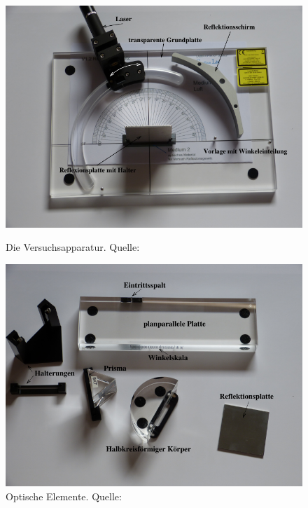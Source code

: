 \begin{figure}[H]
  \begin{minipage}[b]{.55\linewidth} %
     \includegraphics[width=\linewidth]{pictures/Aufbau.png}
     \caption{Die Versuchsapparatur. Quelle: \cite{AP01}}
     \label{fig:Aufbau}
  \end{minipage}
  \begin{minipage}[b]{.55\linewidth} %
     \includegraphics[width=\linewidth]{pictures/Teile.png}
     \caption{Optische Elemente. Quelle: \cite{AP01}}
     \label{fig:Teile}
  \end{minipage}
\end{figure}

